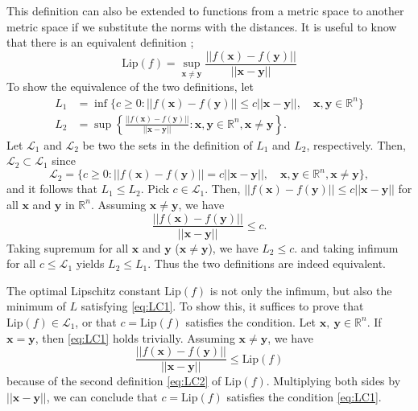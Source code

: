 \documentclass[12pt]{report}
\numberwithin{figure}{chapter}
\theoremstyle{plain}
\theoremstyle{definition}
\theoremstyle{corollary}
\theoremstyle{definition}
\theoremstyle{plain}
\theoremstyle{definition}
\theoremstyle{plain}
\newcommand\bx{\ensuremath{\boldsymbol x}}
\newcommand\by{\ensuremath{\boldsymbol y}}
\newcommand\lip{\ensuremath{\text{Lip}}}
\begin{document}
This definition can also be extended to functions from a metric space to another metric space if we substitute the norms with the distances.
It is useful to know that there is an equivalent definition ;
\begin{equation}\label{eq:LC2}
\lip(f)=\sup_{\bx\neq\by}\frac{||f(\bx)-f(\by)||}{||\bx-\by||}
\end{equation}
To show the equivalence of the two definitions, let
\begin{equation}\label{eq:equivalent_def}
\begin{aligned}
L_1&=\inf\{c\ge0:||f(\bx)-f(\by)||\le c||\bx-\by||,\quad\bx,\by\in\mathbb R^n\}\\
L_2&=\sup\left\{\frac{||f(\bx)-f(\by)||}{||\bx-\by||}:\bx,\by\in\mathbb R^n,\bx\neq\by\right\}.
\end{aligned}
\end{equation}
Let \(\mathcal L_1\) and \(\mathcal L_2\) be two the sets in the definition of \(L_1\) and \(L_2\), respectively.
Then, \(\mathcal L_2\subset\mathcal L_1\) since
\[\mathcal L_2=\{c\ge0:||f(\bx)-f(\by)||=c||\bx-\by||,\quad\bx,\by\in\mathbb R^n,\bx\neq\by\},\]
and it follows that \(L_1\le L_2\).
Pick \(c\in\mathcal L_1\).
Then, \(||f(\bx)-f(\by)||\le c||\bx-\by||\) for all \(\bx\) and \(\by\) in \(\mathbb R^n\).
Assuming \(\bx\neq \by\), we have
\[
\frac{||f(\bx)-f(\by)||}{||\bx-\by||}\le c.
\]
Taking supremum for all \bx{} and \by{} (\(\bx\neq\by\)), we have \(L_2\le c.\) and taking infimum for all \(c\le\mathcal L_1\) yields \(L_2\le L_1\).
Thus the two definitions are indeed equivalent.

The optimal Lipschitz constant \(\lip(f)\) is not only the infimum, but also the minimum of \(L\) satisfying \eqref{eq:LC1}.
To show this, it suffices to prove that \(\lip(f)\in\mathcal L_1\), or that \(c=\lip(f)\) satisfies the condition.
Let \(\bx,\:\by\in\mathbb R^n\).
If \(\bx=\by\), then \eqref{eq:LC1} holds trivially.
Assuming \(\bx\neq\by\), we have
\[
\frac{||f(\bx)-f(\by)||}{||\bx-\by||}\le\lip(f)
\]
because of the second definition \eqref{eq:LC2} of \(\lip(f)\).
Multiplying both sides by \(||\bx-\by||\), we can conclude that \(c=\lip(f)\) satisfies the condition \eqref{eq:LC1}.
\end{document}
